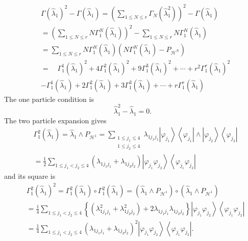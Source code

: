 \documentclass[aps,preprint]{revtex4}%
\begin{document}
\begin{align*}
&  \Gamma\left(  \hat{\lambda}_{1}\right)  ^{2}-\Gamma\left(  \hat{\lambda
}_{1}\right)  =\left(  \sum_{1\leq N\leq r}\Gamma_{N}\left(  \hat{\lambda}%
_{1}^{2}\right)  \right)  ^{2}-\Gamma\left(  \hat{\lambda}_{1}\right) \\
&  =\left(  \sum_{1\leq N\leq r}N\Gamma_{1}^{N}\left(  \hat{\lambda}%
_{1}\right)  \right)  ^{2}-\sum_{1\leq N\leq r}N\Gamma_{1}^{N}\left(
\hat{\lambda}_{1}\right) \\
&  =\sum_{1\leq N\leq r}N\Gamma_{1}^{N}\left(  \hat{\lambda}_{1}\right)
\left(  N\Gamma_{1}^{N}\left(  \hat{\lambda}_{1}\right)  -P_{\mathcal{H}^{N}%
}\right) \\
&  =\quad\Gamma_{1}^{1}\left(  \hat{\lambda}_{1}\right)  ^{2}+4\Gamma_{1}%
^{2}\left(  \hat{\lambda}_{1}\right)  ^{2}+9\Gamma_{1}^{3}\left(  \hat
{\lambda}_{1}\right)  ^{2}+\cdots+r^{2}\Gamma_{1}^{r}\left(  \hat{\lambda}%
_{1}\right)  ^{2}\\
&  -\Gamma_{1}^{1}\left(  \hat{\lambda}_{1}\right)  +2\Gamma_{1}^{2}\left(
\hat{\lambda}_{1}\right)  +3\Gamma_{1}^{3}\left(  \hat{\lambda}_{1}\right)
+\cdots+r\Gamma_{1}^{r}\left(  \hat{\lambda}_{1}\right)
\end{align*}
The one particle condition is
\[
\hat{\lambda}_{1}^{2}-\hat{\lambda}_{1}=0.
\]
The two particle expansion gives
\begin{align*}
&  \Gamma_{1}^{2}\left(  \hat{\lambda}_{1}\right)  =\hat{\lambda}_{1}\wedge
P_{\mathcal{H}^{1}}=\sum_{\substack{1\leq j_{1}\leq4\\1\leq j_{2}\leq
4}}\lambda_{1j_{1}j_{1}}\left\vert \varphi_{j_{1}}\right\rangle \left\langle
\varphi_{j_{1}}\right\vert \wedge\left\vert \varphi_{j_{2}}\right\rangle
\left\langle \varphi_{j_{2}}\right\vert \\
&  =\frac{1}{2}\sum_{1\leq j_{1}<j_{2}\leq4}\left(  \lambda_{1j_{1}j_{1}%
}+\lambda_{1j_{2}j_{2}}\right)  \left\vert \varphi_{j_{1}}\varphi_{j_{2}%
}\right\rangle \left\langle \varphi_{j_{1}}\varphi_{j_{2}}\right\vert
\end{align*}
and its square is
\begin{align*}
&  \Gamma_{1}^{2}\left(  \hat{\lambda}_{1}\right)  ^{2}=\Gamma_{1}^{2}\left(
\hat{\lambda}_{1}\right)  \circ\Gamma_{1}^{2}\left(  \hat{\lambda}_{1}\right)
=\left(  \hat{\lambda}_{1}\wedge P_{\mathcal{H}^{1}}\right)  \circ\left(
\hat{\lambda}_{1}\wedge P_{\mathcal{H}^{1}}\right) \\
&  =\frac{1}{4}\sum_{1\leq j_{1}<j_{2}\leq4}\left\{  \left(  \lambda
_{1j_{1}j_{1}}^{2}+\lambda_{1j_{2}j_{2}}^{2}\right)  \right.  +\left.
2\lambda_{1j_{1}j_{1}}\lambda_{1j_{2}j_{2}}\right\}  \left\vert \varphi
_{j_{1}}\varphi_{j_{2}}\right\rangle \left\langle \varphi_{j_{1}}%
\varphi_{j_{2}}\right\vert \\
&  =\frac{1}{4}\sum_{1\leq j_{1}<j_{2}\leq4}\left(  \lambda_{1j_{1}j_{1}%
}+\lambda_{1j_{2}j_{2}}\right)  ^{2}\left\vert \varphi_{j_{1}}\varphi_{j_{2}%
}\right\rangle \left\langle \varphi_{j_{1}}\varphi_{j_{2}}\right\vert .
\end{align*}
\end{document}
